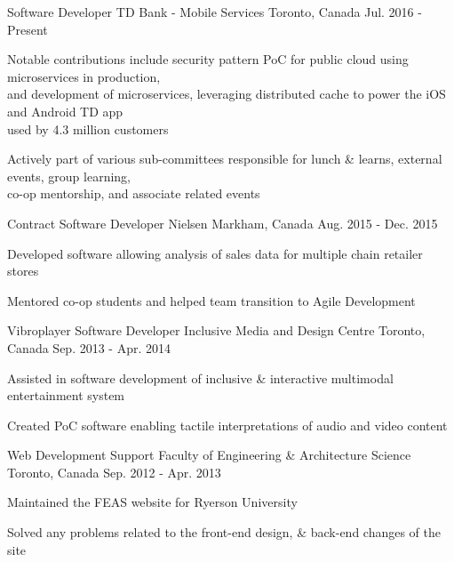\begin{cventries}
  \cventry
    {Software Developer}
    {TD Bank - Mobile Services}
    {Toronto, Canada}
    {Jul. 2016 - Present}
    {
      \begin{cvitems}
        \item {Notable contributions include security pattern PoC for public cloud using microservices in production, \\ and development of microservices, leveraging distributed cache to power the iOS and Android TD app \\used by 4.3 million customers}
        \item {Actively part of various sub-committees responsible for lunch \& learns, external events, group learning, \\ co-op mentorship, and associate related events}
      \end{cvitems}
    }
  \cventry
    {Contract Software Developer}
    {Nielsen}
    {Markham, Canada}
    {Aug. 2015 - Dec. 2015}
    {
      \begin{cvitems}
        \item {Developed software allowing analysis of sales data for multiple chain retailer stores}
        \item {Mentored co-op students and helped team transition to Agile Development}
      \end{cvitems}
    }
  \cventry
    {Vibroplayer Software Developer}
    {Inclusive Media and Design Centre}
    {Toronto, Canada}
    {Sep. 2013 - Apr. 2014}
    {
      \begin{cvitems}
        \item {Assisted in software development of inclusive \& interactive multimodal entertainment system}
        \item {Created PoC software enabling tactile interpretations of audio and video content}
      \end{cvitems}
    }
 \cventry
   {Web Development Support}
    {Faculty of Engineering \& Architecture Science}
    {Toronto, Canada}
    {Sep. 2012 - Apr. 2013}
    {
      \begin{cvitems}
        \item {Maintained the FEAS website for Ryerson University}
        \item {Solved any problems related to the front-end design, \& back-end changes of the site}
     \end{cvitems}
    }
\end{cventries}